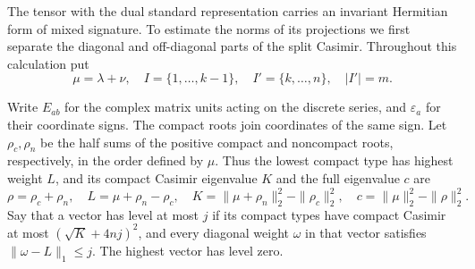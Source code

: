 The tensor with the dual standard representation carries an invariant
Hermitian form of mixed signature. To estimate the norms of its
projections we first separate the diagonal and off-diagonal parts of
the split Casimir. Throughout this calculation put
\[
  \mu=\lambda+\nu,\quad
  I=\{1,\ldots,k-1\},\quad I'=\{k,\ldots,n\},\quad |I'|=m .
\]

Write \(E_{ab}\) for the complex matrix units acting on the
discrete series, and \(\varepsilon_a\) for their coordinate signs.
The compact roots join coordinates of the same sign. Let
\(\rho_c,\rho_n\) be the half sums of the positive compact and
noncompact roots, respectively, in the order defined by \(\mu\).
Thus the lowest compact type has highest weight \(L\), and its
compact Casimir eigenvalue \(K\) and the full eigenvalue \(c\) are
\begin{equation}\label{eq:paired-lowest-casimirs}
 \rho=\rho_c+\rho_n,\quad L=\mu+\rho_n-\rho_c,\quad
 K=\|\mu+\rho_n\|_2^2-\|\rho_c\|_2^2,\quad
 c=\|\mu\|_2^2-\|\rho\|_2^2 .
\end{equation}
Say that a vector has level at most \(j\) if its compact types
have compact Casimir at most \((\sqrt K+4nj)^2\), and every
diagonal weight \(\omega\) in that vector satisfies
\(\|\omega-L\|_1\le j\). The highest vector has level zero.

